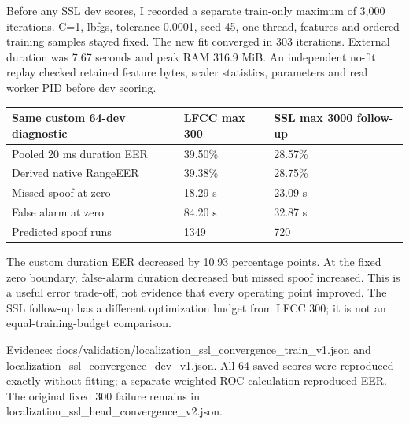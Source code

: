\documentclass[10pt,a4paper]{article}
\begin{document}
Before any SSL dev scores, I recorded a separate train-only maximum of 3,000 iterations. C=1, lbfgs, tolerance 0.0001, seed 45, one thread, features and ordered training samples stayed fixed. The new fit converged in 303 iterations. External duration was 7.67 seconds and peak RAM 316.9 MiB. An independent no-fit replay checked retained feature bytes, scaler statistics, parameters and real worker PID before dev scoring.\par

\begin{center}\small

\begin{tabular}{@{}lll@{}}\toprule

Same custom 64-dev diagnostic & LFCC max 300 & SSL max 3000 follow-up \\

\midrule

Pooled 20 ms duration EER & 39.50\% & 28.57\% \\

Derived native RangeEER & 39.38\% & 28.75\% \\

Missed spoof at zero & 18.29 s & 23.09 s \\

False alarm at zero & 84.20 s & 32.87 s \\

Predicted spoof runs & 1349 & 720 \\

\bottomrule\end{tabular}\end{center}

The custom duration EER decreased by 10.93 percentage points. At the fixed zero boundary, false-alarm duration decreased but missed spoof increased. This is a useful error trade-off, not evidence that every operating point improved. The SSL follow-up has a different optimization budget from LFCC 300; it is not an equal-training-budget comparison.\par

{\small Evidence: docs/validation/localization\_ssl\_convergence\_train\_v1.json and localization\_ssl\_convergence\_dev\_v1.json. All 64 saved scores were reproduced exactly without fitting; a separate weighted ROC calculation reproduced EER. The original fixed 300 failure remains in localization\_ssl\_head\_convergence\_v2.json.}\par

\clearpage
\end{document}
